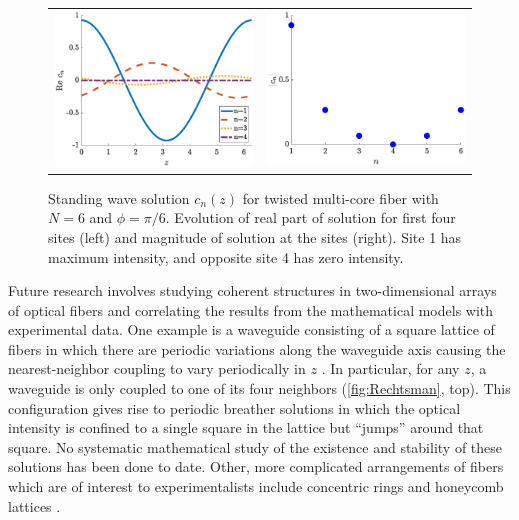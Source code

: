 \documentclass[12pt,reqno,oneside,hidelinks]{article}
\begin{document}
\begin{figure}
\begin{center}
\begin{tabular}{cc}
\includegraphics[width=8cm]{images/evenholestandingwave.eps} &
\includegraphics[width=8cm]{images/evenholeamps.eps}
\end{tabular}
\end{center}
\caption{Standing wave solution $c_n(z)$ for twisted multi-core fiber with $N = 6$ and $\phi = \pi/6$. Evolution of real part of solution for first four sites (left) and magnitude of solution at the sites (right). Site 1 has maximum intensity, and opposite site 4 has zero intensity.}
\label{fig:twistcn}
\end{figure}

Future research involves studying coherent structures in two-dimensional arrays of optical fibers and correlating the results from the mathematical models with experimental data. One example is a waveguide consisting of a square lattice of fibers in which there are periodic variations along the waveguide axis causing the nearest-neighbor coupling to vary periodically in $z$ \cite{Mukherjee2020}. In particular, for any $z$, a waveguide is only coupled to one of its four neighbors (\cref{fig:Rechtsman}, top). This configuration gives rise to periodic breather solutions in which the optical intensity is confined to a single square in the lattice but ``jumps'' around that square. No systematic mathematical study of the existence and stability of these solutions has been done to date. Other, more complicated arrangements of fibers which are of interest to experimentalists include concentric rings and honeycomb lattices \cite{Lumer2013}.
\end{document}
